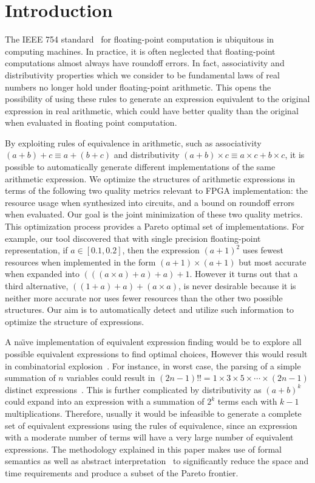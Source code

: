 \section{Introduction}
\label{sec:introduction}

The IEEE 754 standard~\cite{ieee754} for floating-point computation is
ubiquitous in computing machines. In practice, it is often neglected that
floating-point computations almost always have roundoff errors. In fact,
associativity and distributivity properties which we consider to be fundamental
laws of real numbers no longer hold under floating-point arithmetic. This opens
the possibility of using these rules to generate an expression equivalent to
the original expression in real arithmetic, which could have better quality
than the original when evaluated in floating point computation.

By exploiting rules of equivalence in arithmetic, such as associativity $(a
+ b) + c \equiv a + (b + c)$ and distributivity $(a + b) \times c \equiv a
\times c + b \times c$, it is possible to automatically generate different
implementations of the same arithmetic expression. We optimize the structures
of arithmetic expressions in terms of the following two quality metrics
relevant to FPGA implementation: the resource usage when synthesized into
circuits, and a bound on roundoff errors when evaluated. Our goal is the joint
minimization of these two quality metrics. This optimization process provides
a Pareto optimal set of implementations. For example, our tool discovered that
with single precision floating-point representation, if $a \in [0.1, 0.2]$,
then the expression ${(a + 1)}^2$ uses fewest resources when implemented in the
form $(a + 1) \times (a + 1)$ but most accurate when expanded into $(((a \times
a) + a) + a) + 1$. However it turns out that a third alternative, $((1 + a)
+ a) + (a \times a)$, is never desirable because it is neither more accurate
nor uses fewer resources than the other two possible structures. Our aim is to
automatically detect and utilize such information to optimize the structure of
expressions.

A na{\"\i}ve implementation of equivalent expression finding would be to
explore all possible equivalent expressions to find optimal choices, However
this would result in combinatorial explosion~\cite{ioualalen}. For instance,
in worst case, the parsing of a simple summation of $n$ variables could
result in $(2n - 1)!! = 1\times3\times5\times\cdots\times(2n - 1)$ distinct
expressions~\cite{ioualalen, mouilleron}. This is further complicated by
distributivity as ${(a + b)}^k$ could expand into an expression with a
summation of $2^k$ terms each with $k - 1$ multiplications. Therefore, usually
it would be infeasible to generate a complete set of equivalent expressions
using the rules of equivalence, since an expression with a moderate number of
terms will have a very large number of equivalent expressions. The methodology
explained in this paper makes use of formal semantics as well as abstract
interpretation~\cite{cousot77} to significantly reduce the space and time
requirements and produce a subset of the Pareto frontier.


